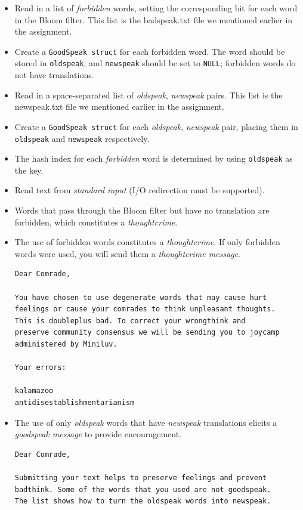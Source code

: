 \documentclass{article}
\begin{document}
\begin{itemize}
\item Read in a list of \emph{forbidden} words, setting the corresponding bit
    for each word in the Bloom filter. This list is the badspeak.txt file we mentioned earlier in the assignment.
\item Create a \texttt{GoodSpeak struct} for each forbidden word. The word
    should be stored in \texttt{oldspeak}, and \texttt{newspeak} should be
    set to \texttt{NULL}; forbidden words do not have translations.
\item Read in a space-separated list of \emph{oldspeak}, \emph{newspeak} pairs.
    This list is the newspeak.txt file we mentioned earlier in the assignment.
\item Create a \texttt{GoodSpeak struct} for each \emph{oldspeak},
    \emph{newspeak} pair, placing them in \texttt{oldspeak} and
    \texttt{newspeak} respectively.
\item The hash index for each \emph{forbidden} word is determined by using
    \texttt{oldspeak} as the key.
\item Read text from \emph{standard input} (I/O redirection must be supported).
\item Words that pass through the Bloom filter but have no translation are forbidden,
    which constitutes a \emph{thoughtcrime}.
\item The use of forbidden words constitutes a \emph{thoughtcrime}. If only
    forbidden words were used, you will send them a \emph{thoughtcrime message}.
\begin{lstlisting}[title=Example thoughtcrime message.]
Dear Comrade,

You have chosen to use degenerate words that may cause hurt
feelings or cause your comrades to think unpleasant thoughts.
This is doubleplus bad. To correct your wrongthink and
preserve community consensus we will be sending you to joycamp
administered by Miniluv.

Your errors:

kalamazoo
antidisestablishmentarianism
\end{lstlisting}
\item The use of only \emph{oldspeak} words that have \emph{newspeak}
    translations elicits a \emph{goodspeak message} to provide encouragement.
\begin{lstlisting}[title=Example goodspeak message.]
Dear Comrade,

Submitting your text helps to preserve feelings and prevent
badthink. Some of the words that you used are not goodspeak.
The list shows how to turn the oldspeak words into newspeak.


\end{lstlisting}
\end{itemize}
\end{document}
